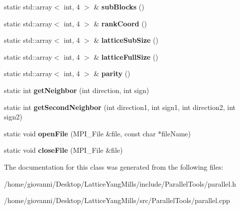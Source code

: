 \begin{DoxyCompactItemize}
\item 
static std\+::array$<$ int, 4 $>$ \& {\bfseries sub\+Blocks} ()\hypertarget{classParallel_ad237dc02b7a88cfc454b5a87573588ea}{}\label{classParallel_ad237dc02b7a88cfc454b5a87573588ea}

\item 
static std\+::array$<$ int, 4 $>$ \& {\bfseries rank\+Coord} ()\hypertarget{classParallel_a64dc2b62abe04ae4eeb2c55f9407b9dd}{}\label{classParallel_a64dc2b62abe04ae4eeb2c55f9407b9dd}

\item 
static std\+::array$<$ int, 4 $>$ \& {\bfseries lattice\+Sub\+Size} ()\hypertarget{classParallel_addeb93b221ca944c1916033f8ac5144e}{}\label{classParallel_addeb93b221ca944c1916033f8ac5144e}

\item 
static std\+::array$<$ int, 4 $>$ \& {\bfseries lattice\+Full\+Size} ()\hypertarget{classParallel_a5e2b7f890813ffc45221d92aee3e51bd}{}\label{classParallel_a5e2b7f890813ffc45221d92aee3e51bd}

\item 
static std\+::array$<$ int, 4 $>$ \& {\bfseries parity} ()\hypertarget{classParallel_ae4d683542868851b8d8229493c0fa412}{}\label{classParallel_ae4d683542868851b8d8229493c0fa412}

\item 
static int {\bfseries get\+Neighbor} (int direction, int sign)\hypertarget{classParallel_a4e99d3605b17fb51fa8a566cf0730179}{}\label{classParallel_a4e99d3605b17fb51fa8a566cf0730179}

\item 
static int {\bfseries get\+Second\+Neighbor} (int direction1, int sign1, int direction2, int sign2)\hypertarget{classParallel_afaecf8622c16bb5def671d881821db7d}{}\label{classParallel_afaecf8622c16bb5def671d881821db7d}

\item 
static void {\bfseries open\+File} (M\+P\+I\+\_\+\+File \&file, const char $\ast$file\+Name)\hypertarget{classParallel_afea26fc4854070b69224b42962b13091}{}\label{classParallel_afea26fc4854070b69224b42962b13091}

\item 
static void {\bfseries close\+File} (M\+P\+I\+\_\+\+File \&file)\hypertarget{classParallel_ad9ace91bf01fd00c19f7a20efc796285}{}\label{classParallel_ad9ace91bf01fd00c19f7a20efc796285}

\end{DoxyCompactItemize}


The documentation for this class was generated from the following files\+:\begin{DoxyCompactItemize}
\item 
/home/giovanni/\+Desktop/\+Lattice\+Yang\+Mills/include/\+Parallel\+Tools/parallel.\+h\item 
/home/giovanni/\+Desktop/\+Lattice\+Yang\+Mills/src/\+Parallel\+Tools/parallel.\+cpp\end{DoxyCompactItemize}
